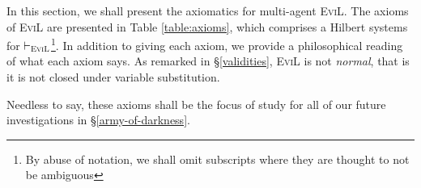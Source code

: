 In this section, we shall present the axiomatics for multi-agent
\textsc{EviL}. The axioms of \textsc{EviL} are presented in 
Table \ref{table:axioms}, which comprises a Hilbert systems for
$\vdash_{\textsc{EviL}}$\footnote{By abuse of notation, we shall omit
  subscripts where they are thought to not be ambiguous}.  In addition
to giving each axiom, we provide a philosophical reading of what each
axiom says.  As remarked in \S\ref{validities}, \textsc{EviL} is not
\emph{normal}, that is it is not closed under variable substitution.



Needless to say, these axioms shall be the focus of study for all of
our future investigations in \S\ref{army-of-darkness}.





